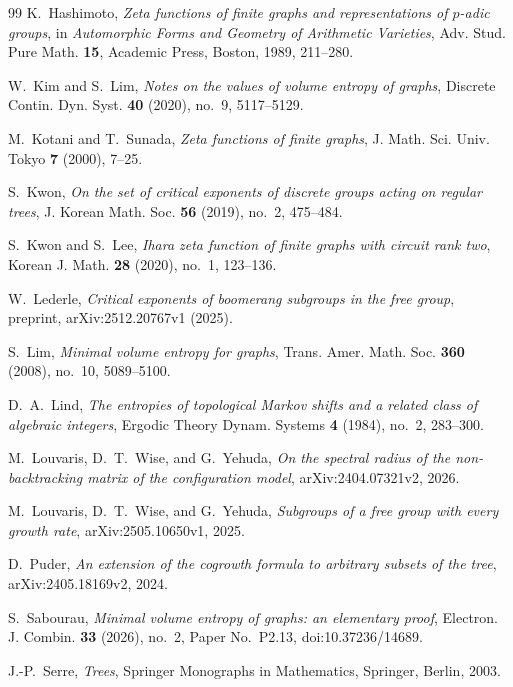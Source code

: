 \documentclass[11pt]{amsart}
\theoremstyle{plain}
\theoremstyle{definition}
\theoremstyle{remark}
\begin{document}
\begin{thebibliography}{99}
K.~Hashimoto,
\emph{Zeta functions of finite graphs and representations of
\(p\)-adic groups},
in \emph{Automorphic Forms and Geometry of Arithmetic Varieties},
Adv. Stud. Pure Math. \textbf{15}, Academic Press, Boston, 1989,
211--280.

W.~Kim and S.~Lim,
\emph{Notes on the values of volume entropy of graphs},
Discrete Contin. Dyn. Syst. \textbf{40} (2020), no.~9, 5117--5129.

M.~Kotani and T.~Sunada,
\emph{Zeta functions of finite graphs},
J. Math. Sci. Univ. Tokyo \textbf{7} (2000), 7--25.

S.~Kwon,
\emph{On the set of critical exponents of discrete groups acting on regular
trees},
J. Korean Math. Soc. \textbf{56} (2019), no.~2, 475--484.

S.~Kwon and S.~Lee,
\emph{Ihara zeta function of finite graphs with circuit rank two},
Korean J. Math. \textbf{28} (2020), no.~1, 123--136.

W.~Lederle,
\emph{Critical exponents of boomerang subgroups in the free group},
preprint, arXiv:2512.20767v1 (2025).

S.~Lim,
\emph{Minimal volume entropy for graphs},
Trans. Amer. Math. Soc. \textbf{360} (2008), no.~10, 5089--5100.

D.~A.~Lind,
\emph{The entropies of topological Markov shifts and a related class of
algebraic integers},
Ergodic Theory Dynam. Systems \textbf{4} (1984), no.~2, 283--300.

M.~Louvaris, D.~T.~Wise, and G.~Yehuda,
\emph{On the spectral radius of the non-backtracking matrix of the
configuration model},
arXiv:2404.07321v2, 2026.

M.~Louvaris, D.~T.~Wise, and G.~Yehuda,
\emph{Subgroups of a free group with every growth rate},
arXiv:2505.10650v1, 2025.

D.~Puder,
\emph{An extension of the cogrowth formula to arbitrary subsets of the tree},
arXiv:2405.18169v2, 2024.

S.~Sabourau,
\emph{Minimal volume entropy of graphs: an elementary proof},
Electron. J. Combin. \textbf{33} (2026), no.~2, Paper No.~P2.13,
doi:10.37236/14689.

J.-P.~Serre,
\emph{Trees},
Springer Monographs in Mathematics, Springer, Berlin, 2003.


\end{thebibliography}
\end{document}
